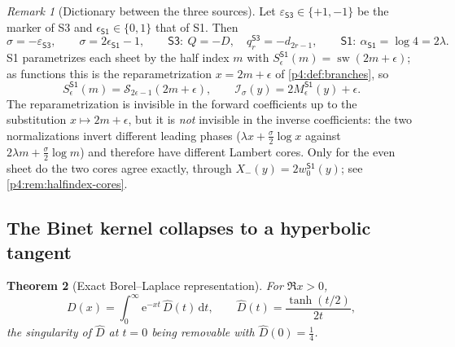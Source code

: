 \documentclass[11pt,a4paper,oneside]{book}
\theoremstyle{plain}
\newtheorem{theorem}{Theorem}[chapter]
\theoremstyle{definition}
\theoremstyle{remark}
\newtheorem{remark}[theorem]{Remark}
\newcommand{\e}{\mathrm{e}}
\newcommand{\dd}{\mathrm{d}}
\newcommand{\Xcore}{X}
\begin{document}
\begin{remark}[Dictionary between the three sources]
\label{p4:rem:dictionary}
Let $\varepsilon_{\textsf{S3}}\in\{+1,-1\}$ be the marker of \textsf{S3} and
$\epsilon_{\textsf{S1}}\in\{0,1\}$ that of \textsf{S1}.  Then
\[
  \sigma=-\varepsilon_{\textsf{S3}},
  \qquad
  \sigma=2\epsilon_{\textsf{S1}}-1,
  \qquad
  \textsf{S3}:\ Q=-D,\quad q^{\textsf{S3}}_r=-d_{2r-1},
  \qquad
  \textsf{S1}:\ \alpha_{\textsf{S1}}=\log4=2\lambda .
\]
\textsf{S1} parametrizes each sheet by the half index $m$ with
$S^{\textsf{S1}}_{\epsilon}(m)=\operatorname{sw}(2m+\epsilon)$; as functions
this is the reparametrization $x=2m+\epsilon$ of \cref{p4:def:branches}, so
\[
  S^{\textsf{S1}}_{\epsilon}(m)=\mathcal S_{2\epsilon-1}(2m+\epsilon),
  \qquad
  \mathcal I_{\sigma}(y)=2M^{\textsf{S1}}_{\epsilon}(y)+\epsilon .
\]
The reparametrization is invisible in the forward coefficients up to the
substitution $x\mapsto2m+\epsilon$, but it is \emph{not} invisible in the
inverse coefficients: the two normalizations invert different leading phases
($\lambda x+\tfrac\sigma2\log x$ against
$2\lambda m+\tfrac\sigma2\log m$) and therefore have different Lambert cores.
Only for the even sheet do the two cores agree exactly, through
$\Xcore_-(y)=2w^{\textsf{S1}}_0(y)$; see \cref{p4:rem:halfindex-cores}.
\end{remark}

\subsection{The Binet kernel collapses to a hyperbolic tangent}

\begin{theorem}[Exact Borel--Laplace representation]
\label{p4:thm:laplace}
For $\Re x>0$,
\begin{equation}
  \boxed{\;
  D(x)=\int_0^\infty\e^{-xt}\,\widehat D(t)\,\dd t,
  \qquad
  \widehat D(t)=\frac{\tanh(t/2)}{2t},\;}
  \label{p4:eq:laplace}
\end{equation}
the singularity of $\widehat D$ at $t=0$ being removable with
$\widehat D(0)=\tfrac14$.
\end{theorem}
\end{document}
